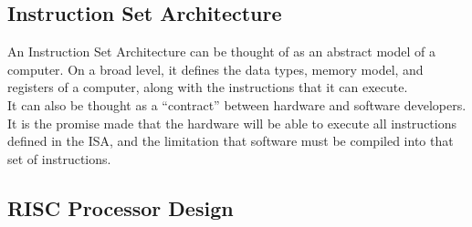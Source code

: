     
\subsection{Instruction Set Architecture}
    An Instruction Set Architecture can be thought of as an abstract model of a computer. On a broad level, it defines the data types, memory model, and registers of a computer, along with the instructions that it can execute. \\
    It can also be thought as a ``contract'' between hardware and software developers. It is the promise made that the hardware will be able to execute all instructions defined in the \ac{ISA}, and the limitation that software must be compiled into that set of instructions.



\subsection{RISC Processor Design}
    
    